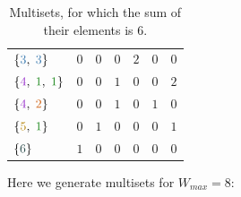 \documentclass[11pt]{article}
\begin{document}
\begin{table}[!hb]
\begin{tabular}{|l|ccccc|c|}
  $\{{\color{c3}3}, \; {\color{c3}3}\}$ 
    & \color{c6}$0$ & \color{c5}$0$ & \color{c4}$0$ & \color{c3}$2$ 
    & \color{c2}$0$ & \color{c1}$0$                                           \\
  $\{{\color{c4}4}, \; {\color{c1}1}, \; {\color{c1}1}\}$ 
    & \color{c6}$0$ & \color{c5}$0$ & \color{c4}$1$ & \color{c3}$0$ 
    & \color{c2}$0$ & \color{c1}$2$                                           \\
  $\{{\color{c4}4}, \; {\color{c2}2}\}$ 
    & \color{c6}$0$ & \color{c5}$0$ & \color{c4}$1$ & \color{c3}$0$ 
    & \color{c2}$1$ & \color{c1}$0$                                           \\
  $\{{\color{c5}5}, \; {\color{c1}1}\}$ 
    & \color{c6}$0$ & \color{c5}$1$ & \color{c4}$0$ & \color{c3}$0$ 
    & \color{c2}$0$ & \color{c1}$1$                                           \\
  $\{{\color{c6}6}\}$ 
    & \color{c6}$1$ & \color{c5}$0$ & \color{c4}$0$ & \color{c3}$0$ 
    & \color{c2}$0$ & \color{c1}$0$                                           \\  
  \hline
  \end{tabular}
  \caption{Multisets, for which the sum of their elements is $6$.}
  \label{tab:ex4}
\end{table}  

Here we generate multisets for $W_{max} = 8$:
\end{document}
